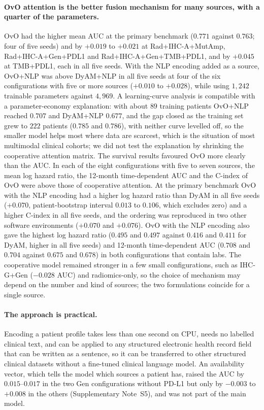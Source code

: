 \paragraph{OvO attention is the better fusion mechanism for many sources, with a quarter of the parameters.}
OvO had the higher mean AUC at the primary benchmark ($0.771$ against $0.763$; four of five seeds) and by $+0.019$ to $+0.021$ at
Rad+IHC-A+MutAmp, Rad+IHC-A+Gen+PDL1 and Rad+IHC-A+Gen+TMB+PDL1, and by $+0.045$ at TMB+PDL1, each in all five seeds.
With the NLP encoding added as a source, OvO+NLP was above DyAM+NLP in all five seeds at four of the six configurations with five or more sources
($+0.010$ to $+0.028$), while using $1{,}242$ trainable parameters against $4{,}969$.
A learning-curve analysis is compatible with a parameter-economy explanation: with about $89$ training patients OvO+NLP reached $0.707$ and DyAM+NLP $0.677$,
and the gap closed as the training set grew to $222$ patients ($0.785$ and $0.786$), with neither curve levelled off, so the smaller model helps most where
data are scarcest, which is the situation of most multimodal clinical cohorts; we did not test the explanation by shrinking the cooperative attention matrix.
The survival results favoured OvO more clearly than the AUC. In each of the eight configurations with five to seven sources, the mean log hazard ratio, the
12-month time-dependent AUC and the C-index of OvO were above those of cooperative attention. At the primary benchmark OvO with the NLP encoding had a higher
log hazard ratio than DyAM in all five seeds ($+0.070$, patient-bootstrap interval $0.013$ to $0.106$, which excludes zero) and a higher C-index in all five seeds,
and the ordering was reproduced in two other software environments ($+0.070$ and $+0.076$). OvO with the NLP encoding also gave the highest log hazard ratio
($0.495$ and $0.497$ against $0.416$ and $0.411$ for DyAM, higher in all five seeds) and 12-month time-dependent AUC ($0.708$ and $0.704$ against $0.675$ and $0.678$) in both
configurations that contain labs. The cooperative model remained stronger in a few small configurations, such as IHC-G+Gen
($-0.028$ AUC) and radiomics-only, so the choice of mechanism may depend on the number and kind of sources; the two formulations coincide for a single source.

\paragraph{The approach is practical.}
Encoding a patient profile takes less than one second on CPU, needs no labelled clinical text, and can be applied to any structured electronic health record
field that can be written as a sentence, so it can be transferred to other structured clinical datasets without a fine-tuned clinical language model.
An availability vector, which tells the model which sources a patient has, raised the AUC by $0.015$--$0.017$ in the two Gen configurations without PD-L1 but only
by $-0.003$ to $+0.008$ in the others (Supplementary Note~S5), and was not part of the main model.

